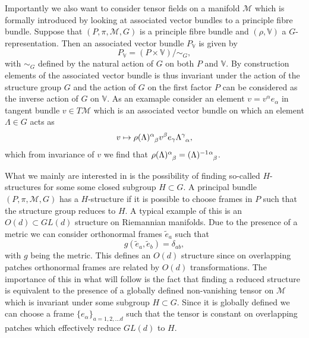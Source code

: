 Importantly we also want to consider tensor fields on a manifold $\mathcal{M}$ which is formally introduced by looking at associated vector bundles to a principle fibre bundle. Suppose that $(P,\pi,\mathcal{M},G)$ is a principle fibre bundle and $(\rho,\mathbb{V})$ a $G$-representation. Then an associated vector bundle $P_{\mathbb{V}}$ is given by 
\begin{equation}
    P_{\mathbb{V}} = (P\times \mathbb{V})/\sim_G,
\end{equation}
with $\sim_G$ defined by the natural action of $G$ on both $P$ and $\mathbb{V}$. By construction elements of the associated vector bundle is thus invariant under the action of the structure group $G$ and the action of $G$ on the first factor $P$ can be considered as the inverse action of $G$ on $\mathbb{V}$. As an examaple consider an element $v=v^\alpha e_\alpha$ in tangent bundle $v\in T\mathcal{M}$ which is an associated vector bundle on which an element $\Lambda\in G$ acts as 
\begin{equation}
    v \mapsto \tensor{\rho(\Lambda)}{^\alpha_\beta} v^{\beta}e_\gamma \tensor{\Lambda}{^\gamma_\alpha},
\end{equation}
which from invariance of $v$ we find that $\tensor{\rho(\Lambda)}{^\alpha_\beta}= \tensor{(\Lambda)}{^{-1}}\tensor{}{^{\alpha}_\beta}$. 

What we mainly are interested in is the possibility of finding so-called $H$-structures for some some closed subgroup $H\subset G$. A principal bundle $(P,\pi,\mathcal{M},G)$ has a $H$-structure if it is possible to choose frames in $P$ such that the structure group reduces to $H$. A typical example of this is an $O(d)\subset GL(d)$ structure on Riemannian manifolds. Due to the presence of a metric we can consider orthonormal frames $\tilde{e}_a$ such that 
\begin{equation}
    g(\tilde{e}_a,\tilde{e}_b) = \delta_{ab},
\end{equation}
with $g$ being the metric. This defines an $O(d)$ structure since on overlapping patches orthonormal frames are related by $O(d)$ transformations. The importance of this in what will follow is the fact that finding a reduced structure is equivalent to the presence of a globally defined non-vanishing tensor on $\mathcal{M}$ which is invariant under some subgroup $H\subset G$. Since it is globally defined we can choose a frame $\{e_{\alpha}\}_{a=1,2,\ldots d}$ such that the tensor is constant on overlapping patches which effectively reduce $GL(d)$ to $H$. 



